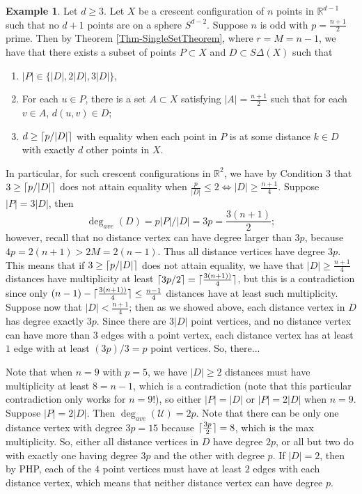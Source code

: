 \documentclass[12pt]{article}
\newcommand{\R}{\mathbb{R}}
\DeclarePairedDelimiter\ceil{\lceil}{\rceil}
\theoremstyle{definition}
\newtheorem{eg}{Example}
\begin{document}
	\begin{eg}
		Let $d \geq 3$.  Let $X$ be a crescent configuration of $n$ points in $\R^{d-1}$ such that no $d+1$ points are on a sphere $S^{d-2}$.  Suppose $n$ is odd with $p = \tfrac{n+1}{2}$ prime.  Then by Theorem \ref{Thm-SingleSetTheorem}, where $r = M = n-1$, we have that there exists a subset of points $P \subset X$ and $D \subset S\Delta(X)$ such that 
		\begin{enumerate}
			\item $|P| \in \{|D|,2|D|,3|D|\}$,
			\item For each $u \in P$, there is a set $A \subset X$ satisfying $|A| = \tfrac{n+1}{2}$ such that for each $v \in A$, $d(u,v) \in D$;
			\item $d \geq \ceil{p/|D|}$ with equality when each point in $P$ is at some distance $k \in D$ with exactly $d$ other points in $X$.
		\end{enumerate}
		In particular, for such crescent configurations in $\R^2$, we have by Condition 3 that $3 \geq \ceil{p/|D|}$ does not attain equality when $\tfrac{p}{|D|}\leq 2 \Leftrightarrow |D| \geq \tfrac{n+1}{4}$.  Suppose $|P| = 3|D|$, then %
		$$\deg_{ave}(D) = p|P|/|D| =3p = \frac{3(n+1)}{2};$$
		however, recall that no distance vertex can have degree larger than $3p$, because $4p = 2(n+1) > 2M = 2(n-1)$.  Thus all distance vertices have degree $3p$.  This means that if $3 \geq \ceil{p/|D|}$ does not attain equality, we have that $|D| \geq \tfrac{n+1}{4}$ distances have multiplicity at least $\ceil{3p/2} = \ceil{\tfrac{3(n+1))}{4}}$, but this is a contradiction since only $(n-1) - \ceil{\tfrac{3(n+1))}{4}} \leq \tfrac{n-1}{4}$ distances have at least such multiplicity.  Suppose now that $|D| < \tfrac{n+1}{4}$; then as we showed above, each distance vertex in $D$ has degree exactly $3p$.  Since there are $3|D|$ point vertices, and no distance vertex can have more than $3$ edges with a point vertex, each distance vertex has at least $1$ edge with at least $(3p)/3 = p$ point vertices.  So, there...
		
		Note that when $n = 9$ with $p = 5$, we have $|D| \geq 2$ distances must have multiplicity at least $8 = n-1$, which is a contradiction (note that this particular contradiction only works for $n=9$!), so either $|P| = |D|$ or $|P| = 2|D|$ when $n = 9$.  Suppose $|P| = 2|D|$.  Then $\deg_{ave}(\mathcal{U}) = 2p$.  Note that there can be only one distance vertex with degree $3p = 15$ because $\ceil{\tfrac{3p}{2}} = 8$, which is the max multiplicity.  So, either all distance vertices in $D$ have degree $2p$, or all but two do with exactly one having degree $3p$ and the other with degree $p$.  If $|D| = 2$, then by PHP, each of the $4$ point vertices must have at least $2$ edges with each distance vertex, which means that neither distance vertex can have degree $p$.  
	\end{eg}
	
\end{document}
